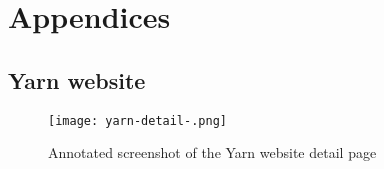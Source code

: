 \part*{Appendices}
\appendix

\chapter{Yarn website} %
\label{chp:appendix-yarn}

\begin{figure}[H]
  \centering
  \texttt{[image: yarn-detail-.png]}
  \caption{Annotated screenshot of the Yarn website detail page}
  \label{figure:yarn-detail-page}
\end{figure}
